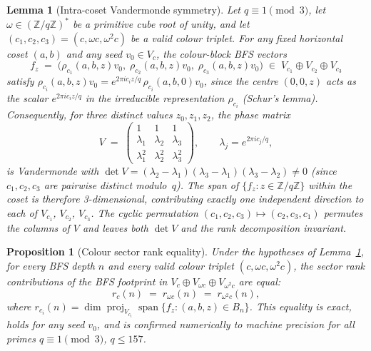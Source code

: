 \documentclass[11pt,a4paper]{article}
\newtheorem{proposition}[theorem]{Proposition}
\newtheorem{lemma}[theorem]{Lemma}
\theoremstyle{definition}
\theoremstyle{remark}
\newcommand{\Z}{\mathbb{Z}}
\begin{document}
      \begin{lemma}[Intra-coset Vandermonde symmetry]
        \label{lem:vandermonde-coset}
        Let $q \equiv 1 \pmod{3}$, let $\omega \in (\Z/q\Z)^*$ be a primitive cube root of unity, and
        let $(c_1, c_2, c_3) = (c, \omega c, \omega^2 c)$ be a valid colour triplet.
        For any fixed horizontal coset $(a,b)$ and any seed $v_0 \in V_c$, the colour-block
        BFS vectors
        \begin{equation}
          f_z \;=\; \bigl(\rho_{c_1}(a,b,z)v_0,\;\rho_{c_2}(a,b,z)v_0,\;\rho_{c_3}(a,b,z)v_0\bigr)
          \;\in\; V_{c_1} \oplus V_{c_2} \oplus V_{c_3}
        \end{equation}
        satisfy $\rho_{c_i}(a,b,z)v_0 = e^{2\pi i c_i z/q}\,\rho_{c_i}(a,b,0)v_0$, since the centre
        $(0,0,z)$ acts as the scalar $e^{2\pi i c_i z/q}$ in the irreducible representation $\rho_{c_i}$
        (Schur's lemma).
        Consequently, for three distinct values $z_0, z_1, z_2$, the phase matrix
        \begin{equation}
          V
          \;=\;
          \begin{pmatrix}
            1 & 1 & 1 \\
            \lambda_1 & \lambda_2 & \lambda_3 \\
            \lambda_1^2 & \lambda_2^2 & \lambda_3^2
          \end{pmatrix},
          \qquad \lambda_j = e^{2\pi i c_j/q},
        \end{equation}
        is Vandermonde with $\det V = (\lambda_2-\lambda_1)(\lambda_3-\lambda_1)(\lambda_3-\lambda_2) \neq 0$
        (since $c_1, c_2, c_3$ are pairwise distinct modulo~$q$).
        The span of $\{f_z : z \in \Z/q\Z\}$ within the coset is therefore 3-dimensional, contributing
        exactly one independent direction to each of $V_{c_1}$, $V_{c_2}$, $V_{c_3}$.
        The cyclic permutation $(c_1, c_2, c_3) \mapsto (c_2, c_3, c_1)$ permutes the columns of $V$
        and leaves both $\det V$ and the rank decomposition invariant.
      \end{lemma}

      \begin{proposition}[Colour sector rank equality]
        \label{prop:colour-sector-rank}
        Under the hypotheses of Lemma~\ref{lem:vandermonde-coset}, for every BFS depth $n$ and every
        valid colour triplet $(c, \omega c, \omega^2 c)$, the sector rank contributions of the BFS
        footprint in $V_c \oplus V_{\omega c} \oplus V_{\omega^2 c}$ are equal:
        \begin{equation}
          r_c(n) \;=\; r_{\omega c}(n) \;=\; r_{\omega^2 c}(n),
        \end{equation}
        where $r_{c_i}(n) = \dim \operatorname{proj}_{V_{c_i}} \operatorname{span}\{f_z : (a,b,z) \in B_n\}$.
        This equality is exact, holds for any seed $v_0$, and is confirmed numerically to machine
        precision for all primes $q \equiv 1 \pmod{3}$, $q \leq 157$.
      \end{proposition}
\end{document}
